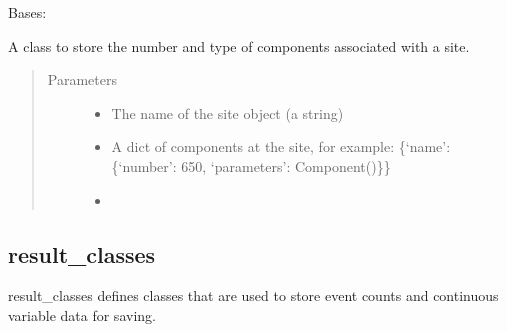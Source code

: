 \documentclass[letterpaper,10pt,english]{sphinxmanual}
\begin{document}

\begin{fulllineitems}
\label{\detokenize{index:feast.EmissionSimModules.infrastructure_classes.Site}}
Bases: 

A class to store the number and type of components associated with a site.
\begin{quote}\begin{description}
\item[{Parameters}] \leavevmode\begin{itemize}
\item {} 
 \textendash{} The name of the site object (a string)

\item {} 
 \textendash{} A dict of components at the site, for example:
\{‘name’: \{‘number’: 650, ‘parameters’: Component()\}\}

\item {} 
 \textendash{} 

\end{itemize}

\end{description}\end{quote}

\end{fulllineitems}



\subsection{result\_classes}
\label{\detokenize{index:module-feast.EmissionSimModules.result_classes}}\label{\detokenize{index:result-classes}}
result\_classes defines classes that are used to store event counts and continuous variable data for saving.
\end{document}
